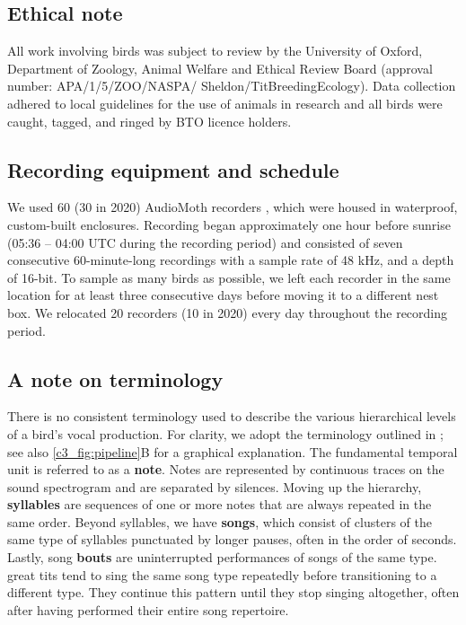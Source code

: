 \subsection{Ethical note}
All work involving birds was subject to review by the University of Oxford, Department of Zoology, Animal Welfare and Ethical Review Board (approval number: APA/1/5/ZOO/NASPA/ Sheldon/TitBreedingEcology). Data collection adhered to local guidelines for the use of animals in research and all birds were caught, tagged, and ringed by BTO licence holders.

\subsection{Recording equipment and schedule}

We used 60 (30 in 2020) AudioMoth recorders \parencite{hill2019}, which were housed in waterproof, custom-built enclosures. Recording began approximately one hour before sunrise (05:36 – 04:00 UTC during the recording period) and consisted of seven consecutive 60-minute-long recordings with a sample rate of 48 kHz, and a depth of 16-bit. To sample as many birds as possible, we left each recorder in the same location for at least three consecutive days before moving it to a different nest box. We relocated 20 recorders (10 in 2020) every day throughout the recording period.

\begin{tcolorbox}[colback=tablegrey, boxrule=0pt, colframe=white, sharp corners] %
    \subsection{A note on terminology}
    There is no consistent terminology used to describe the various hierarchical levels of a bird's vocal production. For clarity, we adopt the terminology outlined in \cite{thompson1994}; see also \autoref{c3_fig:pipeline}B for a graphical explanation. 
    \medskip
    The fundamental temporal unit is referred to as a \textbf{note}. Notes are represented by continuous traces on the sound spectrogram and are separated by silences. Moving up the hierarchy, \textbf{syllables} are sequences of one or more notes that are always repeated in the same order. Beyond syllables, we have \textbf{songs}, which consist of clusters of the same type of syllables punctuated by longer pauses, often in the order of seconds. Lastly, song \textbf{bouts} are uninterrupted performances of songs of the same type. great tits tend to sing the same song type repeatedly before transitioning to a different type. They continue this pattern until they stop singing altogether, often after having performed their entire song repertoire.
\end{tcolorbox}


